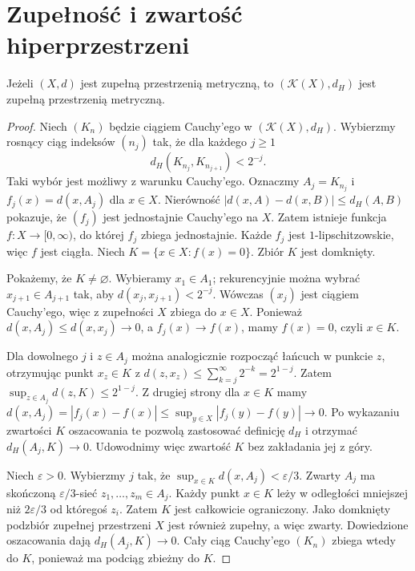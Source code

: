 \section{Zupełność i zwartość hiperprzestrzeni}
\label{sec:topog21-complete}

\begin{twierdzenie}
\label{thm:topog21-complete}
Jeżeli \((X,d)\) jest zupełną przestrzenią metryczną,
to \((\mathcal K(X),d_H)\) jest zupełną przestrzenią
metryczną.
\end{twierdzenie}
\begin{proof}
Niech \((K_n)\) będzie ciągiem Cauchy'ego
w \((\mathcal K(X),d_H)\).
Wybierzmy rosnący ciąg indeksów \((n_j)\)
tak, że dla każdego \(j\ge1\)
\[
 d_H(K_{n_j},K_{n_{j+1}})<2^{-j}.
\]
Taki wybór jest możliwy z warunku Cauchy'ego.
Oznaczmy \(A_j=K_{n_j}\)
i \(f_j(x)=d(x,A_j)\) dla \(x\in X\).
Nierówność
\(|d(x,A)-d(x,B)|\le d_H(A,B)\)
pokazuje, że \((f_j)\) jest jednostajnie Cauchy'ego
na \(X\). Zatem istnieje funkcja \(f\colon X\to[0,\infty)\),
do której \(f_j\) zbiega jednostajnie.
Każde \(f_j\) jest \(1\)-lipschitzowskie,
więc \(f\) jest ciągła.
Niech \(K=\{x\in X:f(x)=0\}\).
Zbiór \(K\) jest domknięty.

Pokażemy, że \(K\neq\varnothing\).
Wybieramy \(x_1\in A_1\);
rekurencyjnie można wybrać \(x_{j+1}\in A_{j+1}\)
tak, aby \(d(x_j,x_{j+1})<2^{-j}\).
Wówczas \((x_j)\) jest ciągiem Cauchy'ego,
więc z zupełności \(X\) zbiega do \(x\in X\).
Ponieważ \(d(x,A_j)\le d(x,x_j)\to0\),
a \(f_j(x)\to f(x)\), mamy \(f(x)=0\),
czyli \(x\in K\).

Dla dowolnego \(j\) i \(z\in A_j\)
można analogicznie rozpocząć łańcuch
w punkcie \(z\), otrzymując punkt
\(x_z\in K\) z
\(d(z,x_z)\le\sum_{k=j}^{\infty}2^{-k}=2^{1-j}\).
Zatem \(\sup_{z\in A_j}d(z,K)\le 2^{1-j}\).
Z drugiej strony dla \(x\in K\) mamy
\(d(x,A_j)=|f_j(x)-f(x)|
\le\sup_{y\in X}|f_j(y)-f(y)|\to0\).
Po wykazaniu zwartości \(K\)
oszacowania te pozwolą zastosować
definicję \(d_H\) i otrzymać \(d_H(A_j,K)\to0\).
Udowodnimy więc zwartość \(K\)
bez zakładania jej z góry.

Niech \(\varepsilon>0\).
Wybierzmy \(j\) tak, że
\(\sup_{x\in K}d(x,A_j)<\varepsilon/3\).
Zwarty \(A_j\) ma skończoną
\(\varepsilon/3\)-sieć \(z_1,\ldots,z_m\in A_j\).
Każdy punkt \(x\in K\) leży
w odległości mniejszej niż \(2\varepsilon/3\)
od któregoś \(z_i\).
Zatem \(K\) jest całkowicie ograniczony.
Jako domknięty podzbiór zupełnej przestrzeni
\(X\) jest również zupełny, a więc zwarty.
Dowiedzione oszacowania dają
\(d_H(A_j,K)\to0\).
Cały ciąg Cauchy'ego \((K_n)\)
zbiega wtedy do \(K\), ponieważ ma podciąg
zbieżny do \(K\).
\end{proof}

